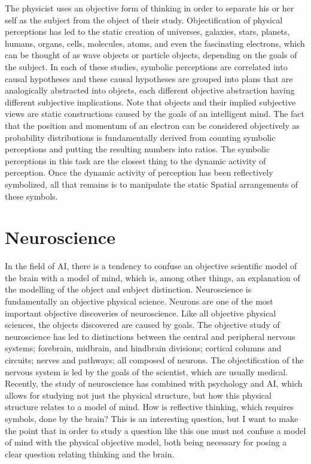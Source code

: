 The physicist uses an objective form of thinking in order to separate
his or her self as the subject from the object of their study.
Objectification of physical perceptions has led to the static creation
of universes, galaxies, stars, planets, humans, organs, cells,
molecules, atoms, and even the fascinating electrons, which can be
thought of as wave objects or particle objects, depending on the goals
of the subject.  In each of these studies, symbolic perceptions are
correlated into causal hypotheses and these causal hypotheses are
grouped into plans that are analogically abstracted into objects, each
different objective abstraction having different subjective
implications.  Note that objects and their implied subjective views
are static constructions caused by the goals of an intelligent mind.
The fact that the position and momentum of an electron can be
considered objectively as probability distributions is fundamentally
derived from counting symbolic perceptions and putting the resulting
numbers into ratios.  The symbolic perceptions in this task are the
closest thing to the dynamic activity of perception.  Once the dynamic
activity of perception has been reflectively symbolized, all that
remains is to manipulate the static Spatial arrangements of these
symbols.

\section{Neuroscience}

In the field of AI, there is a tendency to confuse an objective
scientific model of the brain with a model of mind, which is, among
other things, an explanation of the modelling of the object and
subject distinction.  Neuroscience is fundamentally an objective
physical science.  Neurons are one of the most important objective
discoveries of neuroscience.  Like all objective physical sciences,
the objects discovered are caused by goals.  The objective study of
neuroscience has led to distinctions between the central and
peripheral nervous systems; forebrain, midbrain, and hindbrain
divisions; cortical columns and circuits; nerves and pathways; all
composed of neurons.  The objectification of the nervous system is led
by the goals of the scientist, which are usually medical.  Recently,
the study of neuroscience has combined with psychology and AI, which
allows for studying not just the physical structure, but how this
physical structure relates to a model of mind.  How is reflective
thinking, which requires symbols, done by the brain?  This is an
interesting question, but I want to make the point that in order to
study a question like this one must not confuse a model of mind with
the physical objective model, both being necessary for posing a clear
question relating thinking and the brain.


